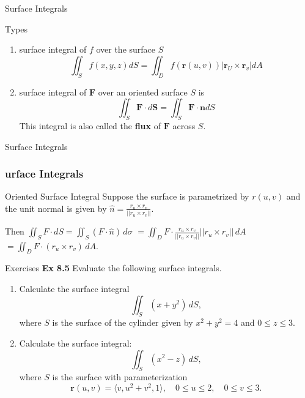 \documentclass[aspectratio=169]{beamer}
\begin{document}
\begin{frame}{Surface Integrals}
    \begin{block}{Types}
        \begin{enumerate}
            \item surface integral of $f$ over the surface $S$
            \begin{equation*}
                \iint_Sf(x,y,z)dS=\iint_D f(\boldsymbol{r}(u,v))\big|\boldsymbol{r}_U\times\boldsymbol{r}_v\big|dA
            \end{equation*}
            \item surface integral of $\boldsymbol{F}$ over an oriented surface $S$ is
            \begin{equation*}
                \iint_S \boldsymbol{F}\cdot d\boldsymbol{S}=\iint_S \boldsymbol{F}\cdot\boldsymbol{n}dS
            \end{equation*}
            This integral is also called the \textbf{flux} of $\boldsymbol{F}$ across $S$.
        \end{enumerate}
        
    \end{block}
    
\end{frame}
\begin{frame}{Surface Integrals}
    \frametitle{urface Integrals}
    \begin{block}{Oriented Surface Integral}
        Suppose the surface is parametrized by $r(u,v)$ and the unit normal is given by $\hat{n} = \frac{r_u \times r_v}{||r_u \times r_v||}$.

    Then $\iint_S F \cdot dS = \iint_S (F \cdot \hat{n}) \,d\sigma$
    $= \iint_D F \cdot \frac{r_u \times r_v}{||r_u \times r_v||} ||r_u \times r_v|| \,dA$
    $= \iint_D F \cdot (r_u \times r_v) \,dA$.
    \end{block}
\end{frame}
\begin{frame}{Exercises}
\textbf{Ex 8.5} Evaluate the following surface integrals.
    \begin{enumerate}
    \item
Calculate the surface integral
\[
\iint_S (x + y^2) \, dS,
\]
where \( S \) is the surface of the cylinder given by \( x^2 + y^2 = 4 \) and \( 0 \leq z \leq 3 \).
\item 
Calculate the surface integral:
\[
\iint_S (x^2 - z) \, dS,
\]
where \( S \) is the surface with parameterization
\[
\mathbf{r}(u,v) = \langle v, u^2 + v^2, 1 \rangle, \quad 0 \leq u \leq 2, \quad 0 \leq v \leq 3.
\]

\end{enumerate}
\end{frame}
\end{document}
